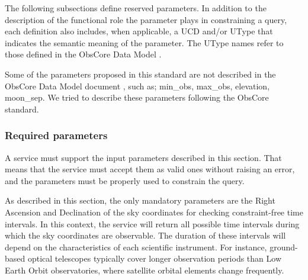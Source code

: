 \documentclass[11pt,a4paper]{ivoatex/ivoa}
\begin{document}
The following subsections define reserved parameters. In addition to the
description of the functional role the parameter plays in constraining a
query, each definition also includes, when applicable, a UCD and/or
UType that indicates the semantic meaning of the parameter. The UType
names refer to those defined in the ObsCore Data Model .

Some of the parameters proposed in this standard are not described in
the ObsCore Data Model document , such as; min\_obs, max\_obs,
elevation, moon\_sep. We tried to describe these parameters following
the ObsCore standard.

\subsubsection{Required parameters}
A service must support the input parameters described in this section.
That means that the service must accept them as valid ones without
raising an error, and the parameters must be properly used to constrain
the query.

As described in this section, the only mandatory parameters are the Right 
Ascension and Declination of the sky coordinates for checking constraint-free 
time intervals. In this context, the service will return all possible time 
intervals during which the sky coordinates are observable. The duration of 
these intervals will depend on the characteristics of each scientific 
instrument. For instance, ground-based optical telescopes typically cover 
longer observation periods than Low Earth Orbit observatories, where 
satellite orbital elements change frequently.
\end{document}
